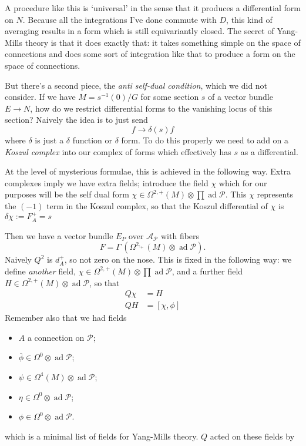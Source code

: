 \documentclass[leqno, openany]{memoir}
\theoremstyle{definition}
\theoremstyle{remark}
\theoremstyle{plain}
\theoremstyle{definition}
\theoremstyle{remark}
\DeclareMathOperator{\ad}{ad}
\begin{document}
A procedure like this is `universal' in the sense that it produces a differential form on $N$. Because all the integrations I've done commute with $D$, this kind of averaging results in a form which is still equivariantly closed.
The secret of Yang-Mills theory is that it does exactly that: it takes something simple on the space of connections and does some sort of integration like that to produce a form on the space of connections.

But there's a second piece, the \emph{anti self-dual condition}, which we did not consider.
If we have $M = s^{-1}(0)/G$ for some section $s$ of a vector bundle $E \to N$, how do we restrict differential forms to the vanishing locus of this section? Naively the idea is to just send
\[
f \to \delta(s) f
\]
where $\delta$ is just a $\delta$ function or $\delta$ form.  To do this properly we need to add on a \emph{Koszul complex} into our complex of forms which effectively has $s$ as a differential.

At the level of mysterious formulae, this is achieved in the following way. Extra complexes imply we have extra fields; introduce the field $\chi$ which for our purposes will be the self dual form $\chi \in \Omega^{2,+}(M) \otimes \prod \ad\mathcal{P}$. This $\chi$ represents the $(-1)$ term in the Koszul complex, so that the Koszul differential of $\chi$ is $\delta \chi := F_{A}^{+} = s$

Then we have a vector bundle $E_{P}$ over $\mathcal{A}_{\mathcal{P}}$ with fibers
\[
F = \Gamma\, (\Omega^{2,_+}(M) \otimes \ad \mathcal{P}).
\]
Naively $Q^{2}$ is $d_{A}^{+}$, so not zero on the nose. This is fixed in the following way: we define \emph{another} field, $\chi \in \Omega^{2,+}(M) \otimes \prod \ad\mathcal{P}$, and a further field $H \in \Omega^{2,+}(M) \otimes \ad\mathcal{P}$, so that
\begin{align}
    Q\chi &= H
  \\
    QH &= [\chi,\phi]
\end{align}
Remember also that we had fields
\begin{itemize}
  \item $A$ a connection on $\mathcal{P}$;
  \item $\overline{\phi} \in \Omega^{0} \otimes \ad \mathcal{P}$;
  \item $\psi \in \Omega^{4}(M) \otimes \ad \mathcal{P}$;
  \item $\eta \in \Omega^{0} \otimes \ad\mathcal{P}$;
        \item $\phi \in \Omega^{0} \otimes \ad\mathcal{P}$.
\end{itemize}
which is a minimal list of fields for Yang-Mills theory. $Q$ acted on these fields by
\end{document}
